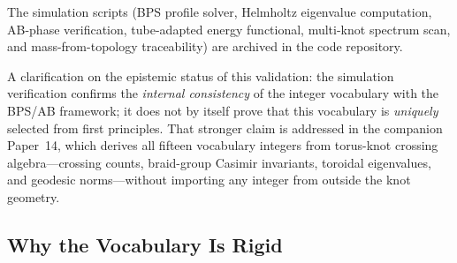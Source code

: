 \documentclass[11pt]{article}
\begin{document}
The simulation scripts (BPS profile solver, Helmholtz eigenvalue
computation, AB-phase verification, tube-adapted energy functional,
multi-knot spectrum scan, and mass-from-topology traceability) are
archived in the code repository.

A clarification on the epistemic status of this validation: the
simulation verification confirms the \emph{internal consistency}
of the integer vocabulary with the BPS/AB framework; it does not
by itself prove that this vocabulary is \emph{uniquely} selected
from first principles.  That stronger claim is addressed in the
companion Paper~14, which derives all fifteen vocabulary integers
from torus-knot crossing algebra---crossing counts, braid-group
Casimir invariants, toroidal eigenvalues, and geodesic
norms---without importing any integer from outside the knot
geometry.

\subsection{Why the Vocabulary Is Rigid}
\label{sec:why-rigid}
\end{document}
